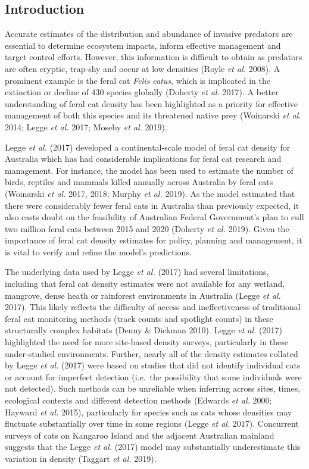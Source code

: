 \documentclass[11pt,a4paper,titlepage,twoside,openright]{style/unimelbthesis}
\begin{document}
\begin{mainmatter}
\newpage

\hypertarget{introduction}{%
\section{Introduction}\label{introduction}}

Accurate estimates of the distribution and abundance of invasive predators are essential to determine ecosystem impacts, inform effective management and target control efforts. However, this information is difficult to obtain as predators are often cryptic, trap-shy and occur at low densities (Royle \emph{et al.} 2008). A prominent example is the feral cat \emph{Felis catus}, which is implicated in the extinction or decline of 430 species globally (Doherty \emph{et al.} 2017). A better understanding of feral cat density has been highlighted as a priority for effective management of both this species and its threatened native prey (Woinarski \emph{et al.} 2014; Legge \emph{et al.} 2017; Moseby \emph{et al.} 2019).

Legge \emph{et al.} (2017) developed a continental-scale model of feral cat density for Australia which has had considerable implications for feral cat research and management. For instance, the model has been used to estimate the number of birds, reptiles and mammals killed annually across Australia by feral cats (Woinarski \emph{et al.} 2017, 2018; Murphy \emph{et al.} 2019). As the model estimated that there were considerably fewer feral cats in Australia than previously expected, it also casts doubt on the feasibility of Australian Federal Government's plan to cull two million feral cats between 2015 and 2020 (Doherty \emph{et al.} 2019). Given the importance of feral cat density estimates for policy, planning and management, it is vital to verify and refine the model's predictions.

The underlying data used by Legge \emph{et al.} (2017) had several limitations, including that feral cat density estimates were not available for any wetland, mangrove, dense heath or rainforest environments in Australia (Legge \emph{et al.} 2017). This likely reflects the difficulty of access and ineffectiveness of traditional feral cat monitoring methods (track counts and spotlight counts) in these structurally complex habitats (Denny \& Dickman 2010). Legge \emph{et al.} (2017) highlighted the need for more site-based density surveys, particularly in these under-studied environments. Further, nearly all of the density estimates collated by Legge \emph{et al.} (2017) were based on studies that did not identify individual cats or account for imperfect detection (i.e.~the possibility that some individuals were not detected). Such methods can be unreliable when inferring across sites, times, ecological contexts and different detection methods (Edwards \emph{et al.} 2000; Hayward \emph{et al.} 2015), particularly for species such as cats whose densities may fluctuate substantially over time in some regions (Legge \emph{et al.} 2017). Concurrent surveys of cats on Kangaroo Island and the adjacent Australian mainland suggests that the Legge \emph{et al.} (2017) model may substantially underestimate this variation in density (Taggart \emph{et al.} 2019).


\end{mainmatter}
\end{document}
